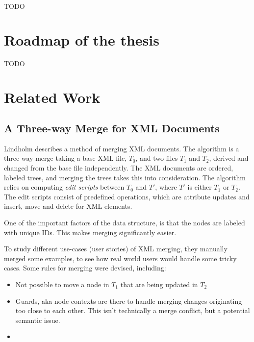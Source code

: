 \documentclass[a4paper,english]{ifimaster}
\begin{document}
TODO

\section{Roadmap of the thesis}
\label{sec:roadmap_of_the_thesis}

TODO

\section{Related Work}
\label{sec:related_work}

\subsection{A Three-way Merge for XML Documents}%
\label{sub:_a_three_way_merge_for_xml_documents}

Lindholm describes a method of merging XML documents. The algorithm is a three-way merge taking a base XML file, $T_0$, and two files $T_1$ and $T_2$, derived and changed from the base file independently. The XML documents are ordered, labeled trees, and merging the trees takes this into consideration. The algorithm relies on computing \textit{edit scripts} between $T_0$ and $T'$, where $T'$ is either $T_1$ or $T_2$. The edit scripts consist of predefined operations, which are attribute updates and insert, move and delete for XML elements.

One of the important factors of the data structure, is that the nodes are labeled with unique IDs. This makes merging significantly easier.

To study different use-cases (user stories) of XML merging, they manually merged some examples, to see how real world users would handle some tricky cases. Some rules for merging were devised, including:

\begin{itemize}
	\item Not possible to move a node in $T_1$ that are being updated in $T_2$
	\item Guards, aka node contexts are there to handle merging changes originating too close to each other. This isn't technically a merge conflict, but a potential semantic issue.
	\item 
\end{itemize}

\backmatter{}

\printbibliography{}
\end{document}
